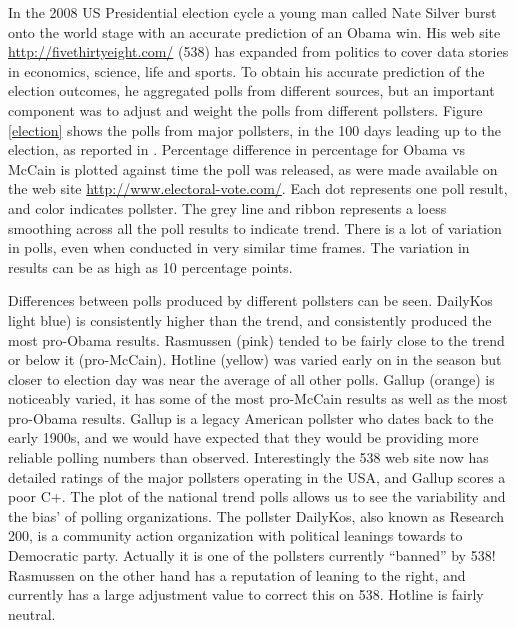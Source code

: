 \documentclass{article}
\begin{document}
In the 2008 US Presidential election cycle a young man called Nate Silver burst onto the world stage with an accurate prediction of an Obama win. His web site \url{http://fivethirtyeight.com/} (538) has expanded from politics to cover data stories in economics, science, life and sports. To obtain his accurate prediction of the election outcomes, he aggregated polls from different sources, but an important component was to adjust and weight the polls from different pollsters. Figure \ref{election} shows the polls from major pollsters, in the 100 days leading up to the election, as reported in \citet{mosley2010}. Percentage difference in percentage for Obama vs McCain is plotted against time the poll was released, as were made available on the web site \url{http://www.electoral-vote.com/}. Each dot represents one poll result, and color indicates pollster. The grey line and ribbon represents a loess smoothing \citep{CGS92} across all the poll results to indicate trend. There is a lot of variation in polls, even when conducted in very similar time frames. The variation in results can be as high as 10 percentage points. 

Differences between polls produced by different pollsters can be seen. DailyKos light blue) is consistently higher than the trend, and consistently produced the most pro-Obama results. Rasmussen (pink) tended to be fairly close to the trend or below it (pro-McCain). Hotline (yellow) was varied early on in the season but closer to election day was near the average of all other polls. Gallup (orange) is noticeably varied, it has some of the most pro-McCain results as well as the most pro-Obama results. Gallup is a legacy American pollster who dates back to the early 1900s, and we would have expected that they would be providing more reliable polling numbers than observed. Interestingly the 538 web site now has detailed ratings of the major pollsters operating in the USA, and Gallup scores a poor C+. The plot of the national trend polls allows us to see the variability and the bias' of polling organizations. The pollster DailyKos, also known as Research 200, is a community action organization with political leanings towards to Democratic party. Actually it is one of the pollsters currently ``banned'' by 538! Rasmussen on the other hand has a reputation of leaning to the right, and currently has a large adjustment value to correct this on 538. Hotline is fairly neutral. 
\end{document}
